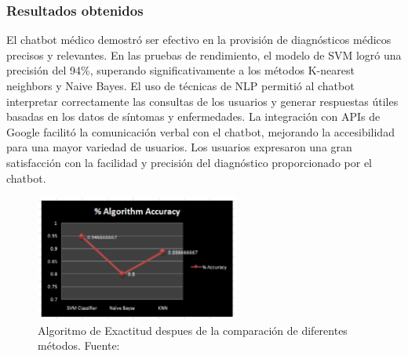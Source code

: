 \subsubsection{Resultados obtenidos}

	El chatbot médico demostró ser efectivo en la provisión de diagnósticos médicos precisos y relevantes. En las pruebas de rendimiento, el modelo de SVM logró una precisión del 94\%, superando significativamente a los métodos K-nearest neighbors y Naive Bayes. El uso de técnicas de NLP permitió al chatbot interpretar correctamente las consultas de los usuarios y generar respuestas útiles basadas en los datos de síntomas y enfermedades. La integración con APIs de Google facilitó la comunicación verbal con el chatbot, mejorando la accesibilidad para una mayor variedad de usuarios. Los usuarios expresaron una gran satisfacción con la facilidad y precisión del diagnóstico proporcionado por el chatbot.
	
	\begin{figure}[H]
		\begin{center}
			\includegraphics[width=0.6\textwidth]{2/1_antecedentes/Resultado2-10.png}
			\caption{Algoritmo de Exactitud despues de la comparación de diferentes métodos. Fuente: \cite{MedicalChatBot} }
		\end{center}
	\end{figure}
	
\vspace{-10mm}